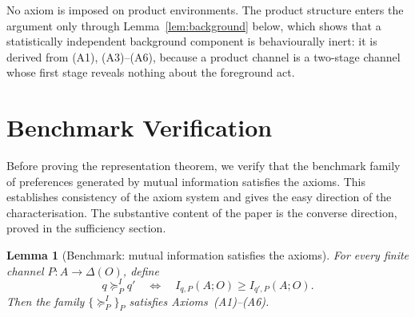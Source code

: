 \documentclass[11pt,a4paper]{article}
\newtheorem{lemma}[theorem]{Lemma}
\theoremstyle{definition}
\newcommand{\1}{\mathbf 1}
\begin{document}
No axiom is imposed on product environments.  The product structure enters the argument only through
Lemma~\ref{lem:background} below, which shows that a statistically independent background component is behaviourally
inert: it is derived from \textup{(A1)}, \textup{(A3)}--\textup{(A6)}, because a product channel is a two-stage channel
whose first stage reveals nothing about the foreground act.

\section*{Benchmark Verification}

Before proving the representation theorem, we verify that the benchmark family of preferences generated by mutual
information satisfies the axioms.  This establishes consistency of the axiom system and gives the easy direction of the
characterisation.  The substantive content of the paper is the converse direction, proved in the sufficiency section.

\begin{lemma}[Benchmark: mutual information satisfies the axioms]\label{lem:MIbenchmark}
For every finite channel $P:A\to\Delta(O)$, define
\[
q\succeq^I_P q'
\quad\Longleftrightarrow\quad
I_{q,P}(A;O)\ge I_{q',P}(A;O).
\]
Then the family $\{\succeq^I_P\}_P$ satisfies Axioms~\textup{(A1)--(A6)}.
\end{lemma}
\end{document}
